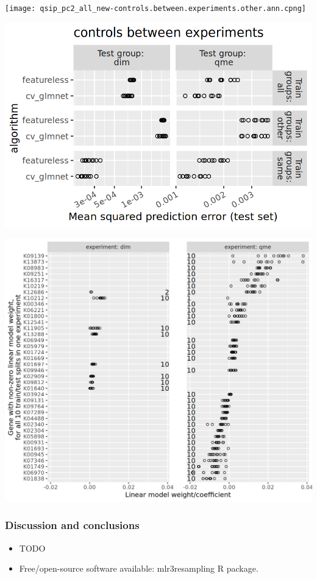 \documentclass{beamer}
\begin{document}
\begin{frame}
  \texttt{[image: qsip\_pc2\_all\_new-controls.between.experiments.other.ann.cpng]}
\end{frame}

\begin{frame}
  \includegraphics[width=\textwidth]{qsip_pc2_all_new-controls.between.experiments.all.png}
\end{frame}

\begin{frame}
  \includegraphics[width=\textwidth]{2024-01-09-qsip_pc2_all_new-controls.between.experiments.weights.png}
\end{frame}

\begin{frame}
  \frametitle{Discussion and conclusions}
  \begin{itemize}
  \item TODO
  \item Free/open-source software available: mlr3resampling R package.
  \end{itemize}
\end{frame}
\end{document}
